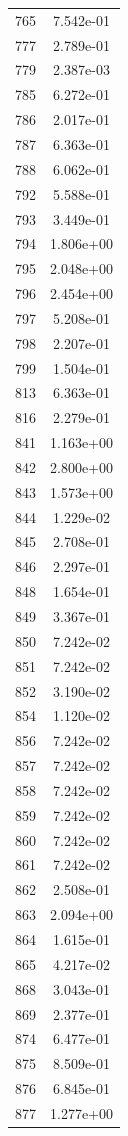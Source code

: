 \documentclass[12pt]{article}
\begin{document}
\begin{longtable}{@{}cc@{}}
765 & 7.542e-01 \\
777 & 2.789e-01 \\
779 & 2.387e-03 \\
785 & 6.272e-01 \\
786 & 2.017e-01 \\
787 & 6.363e-01 \\
788 & 6.062e-01 \\
792 & 5.588e-01 \\
793 & 3.449e-01 \\
794 & 1.806e+00 \\
795 & 2.048e+00 \\
796 & 2.454e+00 \\
797 & 5.208e-01 \\
798 & 2.207e-01 \\
799 & 1.504e-01 \\
813 & 6.363e-01 \\
816 & 2.279e-01 \\
841 & 1.163e+00 \\
842 & 2.800e+00 \\
843 & 1.573e+00 \\
844 & 1.229e-02 \\
845 & 2.708e-01 \\
846 & 2.297e-01 \\
848 & 1.654e-01 \\
849 & 3.367e-01 \\
850 & 7.242e-02 \\
851 & 7.242e-02 \\
852 & 3.190e-02 \\
854 & 1.120e-02 \\
856 & 7.242e-02 \\
857 & 7.242e-02 \\
858 & 7.242e-02 \\
859 & 7.242e-02 \\
860 & 7.242e-02 \\
861 & 7.242e-02 \\
862 & 2.508e-01 \\
863 & 2.094e+00 \\
864 & 1.615e-01 \\
865 & 4.217e-02 \\
868 & 3.043e-01 \\
869 & 2.377e-01 \\
874 & 6.477e-01 \\
875 & 8.509e-01 \\
876 & 6.845e-01 \\
877 & 1.277e+00 \\

\end{longtable}
\end{document}
